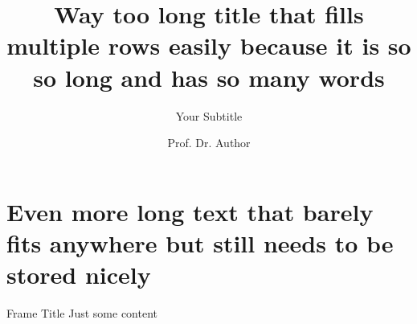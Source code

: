 \documentclass[aspectratio=169,12pt]{beamer}
\author{Prof. Dr. Author}
\title{Way too long title that fills multiple rows easily because it is so so long and has so many words}
\subtitle{Your Subtitle}
\begin{document}
\maketitle

\part{Even more long text that barely fits anywhere but still needs to be stored nicely}
\partpage

\begin{frame}{Frame Title}
Just some content
\end{frame}
\end{document}
